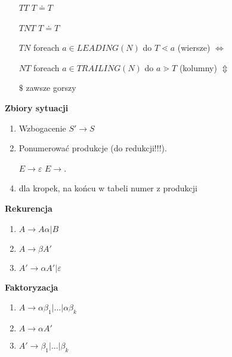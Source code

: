\begin{multicols}{3}
    \begin{enumerate}
      \item [$TT$] $T \doteq T$
      \item [$TNT$] $T \doteq T$
      \item [$TN$] foreach $a \in LEADING(N)$ do $T \lessdot a$ (wiersze) $ \Leftrightarrow $
      \item [$NT$] foreach $a \in TRAILING(N)$ do $a \gtrdot T$ (kolumny) $ \Updownarrow $
      \item [$\$$] zawsze gorszy
    \end{enumerate}
    \textbf{Zbiory sytuacji}
    \begin{enumerate}
      \item Wzbogacenie $ S' \rightarrow S$ 
      \item Ponumerować produkcje (do redukcji!!!).
      \item [$ E \rightarrow \varepsilon $] $E \rightarrow . $
      \item dla kropek, na końcu w tabeli numer z produkcji
    \end{enumerate}
    \textbf{Rekurencja}
    \begin{enumerate}
      \item $A \rightarrow A \alpha | B$
      \item $A \rightarrow \beta A'$
      \item $A' \rightarrow \alpha A' | \varepsilon $
    \end{enumerate}
    \textbf{Faktoryzacja}
    \begin{enumerate}
      \item $A \rightarrow \alpha \beta _{1}|...|\alpha \beta _{k}$
      \item $A \rightarrow \alpha A'$
      \item $A' \rightarrow \beta _{1}|...|\beta _{k}$
    \end{enumerate}
\end{multicols}
 